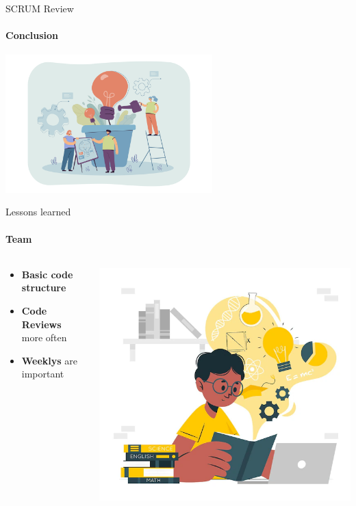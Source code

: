 \documentclass[
ngerman,%
authorontitle=true,
]{bfhbeamer}
\begin{document}
	\begin{frame}{SCRUM Review}
		\framesubtitle{Conclusion}
		\centering
		\includegraphics[width=0.6\textwidth]{pictures/final_presentation/Team growing lightbulb plant}
	\end{frame}
	
	\begin{frame}{Lessons learned}
		\framesubtitle{Team}
		\begin{columns} %
			\begin{column}{0.5\textwidth} %
				\begin{itemize}
					\item \textbf{Basic code structure}
					\item \textbf{Code Reviews} more often 
					\item \textbf{Weeklys} are important
				\end{itemize}
			\end{column}
			\begin{column}{0.3\textwidth} %
				\begin{center}
					\includegraphics[width=1\textwidth]{pictures/Learnings}
				\end{center}
			\end{column}
		\end{columns}
	\end{frame}
	
\end{document}
